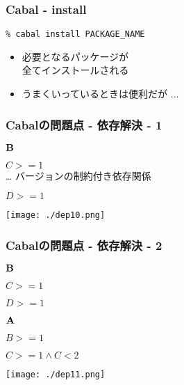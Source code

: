 \documentclass[cjk,dvipdfm,14pt]{beamer}
\begin{document}
\begin{frame}[fragile]
\frametitle{Cabal - install}

\lstset{language=bash,basicstyle=\ttfamily}

\begin{lstlisting}
% cabal install PACKAGE_NAME
\end{lstlisting}



\begin{itemize}
\item 必要となるパッケージが\\全てインストールされる
\item うまくいっているときは便利だが ...
\end{itemize}

\end{frame}

\begin{frame}
\frametitle{Cabalの問題点 - 依存解決 - 1}

\begin{description}
\item ${\bf B}$
\item
  \begin{description}
  \item $C >= 1$ \\{\small … バージョンの制約付き依存関係}
  \item $D >= 1$
  \end{description}
\end{description}

\texttt{[image: ./dep10.png]}
\end{frame}

\begin{frame}
\frametitle{Cabalの問題点 - 依存解決 - 2}

\begin{description}
\item ${\bf B}$
\item
  \begin{description}
  \item $C >= 1$
  \item $D >= 1$
  \end{description}
\end{description}

\begin{description}
\item ${\bf A}$
\item
  \begin{description}
  \item $B >= 1$
  \item $C >= 1 \wedge C < 2$
  \end{description}
\end{description}

\texttt{[image: ./dep11.png]}
\end{frame}
\end{document}
